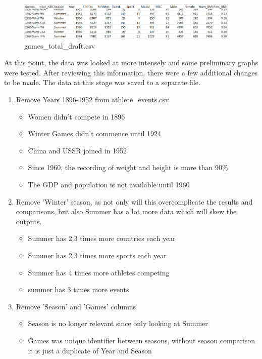 \documentclass[a4 paper, 12pt]{article}
\begin{document}
        \begin{figure} [H]
            \centering
            \includegraphics[width=0.95\textwidth, frame]
                {./images/data/games_draft.png}     
            \caption{games\_total\_draft.csv}               
        \end{figure} 

    At this point, the data was looked at more intensely and some preliminary graphs were tested. After reviewing this information, there were a few additional changes to be made. The data at this stage was saved to a separate file. 
        \begin{enumerate}
            \item Remove Years 1896-1952 from athlete\_events.csv
                \begin{itemize}
                    \item Women didn't compete in 1896
                    \item Winter Games didn't commence until 1924
                    \item China and USSR joined in 1952
                    \item Since 1960, the recording of weight and height is more than 90\% 
                    \item The GDP and population is not available until 1960
                \end{itemize}
            \item Remove 'Winter' season, as not only will this overcomplicate the results and comparisons, but also Summer has a lot more data which will skew the outputs.
                \begin{itemize}
                    \item Summer has 2.3 times more countries each year
                    \item Summer has 2.3 times more sports each year
                    \item Summer has 4 times more athletes competing
                    \item summer has 3 times more events
                \end{itemize}
            \item Remove 'Season' and 'Games' columns   
                \begin{itemize}
                    \item Season is no longer relevant since only looking at Summer
                    \item Games was unique identifier between seasons, without season comparison it is just a duplicate of Year and Season
                \end{itemize}             
        \end{enumerate}
\end{document}
